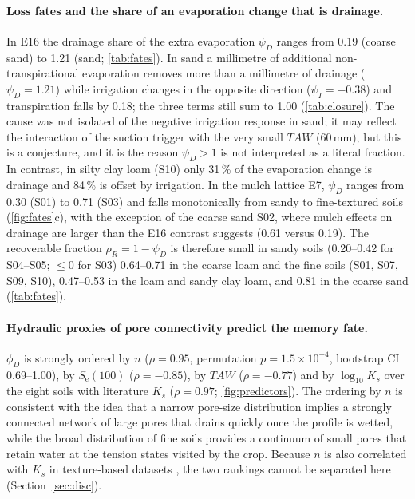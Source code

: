 \documentclass[preprint,12pt,authoryear]{elsarticle}
\newcommand{\Se}{S_{\mathrm{e}}}
\newcommand{\TAW}{\mathit{TAW}}
\begin{document}
\paragraph{Loss fates and the share of an evaporation change that is drainage.}
In E16 the drainage share of the extra evaporation $\psi_D$ ranges from 0.19 (coarse sand) to 1.21 (sand; \cref{tab:fates}). In sand a millimetre of additional non-transpirational evaporation removes more than a millimetre of drainage ($\psi_D=1.21$) while irrigation changes in the opposite direction ($\psi_I=-0.38$) and transpiration falls by 0.18; the three terms still sum to 1.00 (\cref{tab:closure}). The cause was not isolated of the negative irrigation response in sand; it may reflect the interaction of the suction trigger with the very small $\TAW$ (60\,mm), but this is a conjecture, and it is the reason $\psi_D>1$ is not interpreted as a literal fraction. In contrast, in silty clay loam (S10) only 31\,\% of the evaporation change is drainage and 84\,\% is offset by irrigation. In the mulch lattice E7, $\psi_D$ ranges from 0.30 (S01) to 0.71 (S03) and falls monotonically from sandy to fine-textured soils (\cref{fig:fates}c), with the exception of the coarse sand S02, where mulch effects on drainage are larger than the E16 contrast suggests (0.61 versus 0.19). The recoverable fraction $\rho_R=1-\psi_D$ is therefore small in sandy soils (0.20--0.42 for S04--S05; $\leq0$ for S03) 0.64--0.71 in the coarse loam and the fine soils (S01, S07, S09, S10), 0.47--0.53 in the loam and sandy clay loam, and 0.81 in the coarse sand (\cref{tab:fates}).

\paragraph{Hydraulic proxies of pore connectivity predict the memory fate.}
$\phi_D$ is strongly ordered by $n$ ($\rho=0.95$, permutation $p=1.5\times10^{-4}$, bootstrap CI 0.69--1.00), by $\Se(100)$ ($\rho=-0.85$), by $\TAW$ ($\rho=-0.77$) and by $\log_{10}K_s$ over the eight soils with literature $K_s$ ($\rho=0.97$; \cref{fig:predictors}). The ordering by $n$ is consistent with the idea that a narrow pore-size distribution implies a strongly connected network of large pores that drains quickly once the profile is wetted, while the broad distribution of fine soils provides a continuum of small pores that retain water at the tension states visited by the crop. Because $n$ is also correlated with $K_s$ in texture-based datasets \citep{Carsel1988,Schaap2001,Weber2024}, the two rankings cannot be separated here (Section~\ref{sec:disc}).
\end{document}
